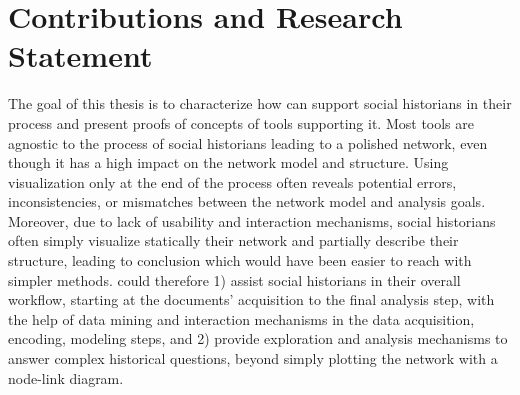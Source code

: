 




\section{Contributions and Research Statement}\label{sec:contribution-and-research-statement}

The goal of this thesis is to characterize how \va can support social historians in their \hsna process and present proofs of concepts of tools supporting it.
Most \snv tools are agnostic to the process of social historians leading to a polished network, even though it has a high impact on the network model and structure.
Using visualization only at the end of the process often reveals potential errors, inconsistencies, or mismatches between the network model and analysis goals\cite{alkadi2022}.
Moreover, due to lack of usability and interaction mechanisms, social historians often simply visualize statically their network and partially describe their structure, leading to conclusion which would have been easier to reach with simpler methods\cite{eveDeuxTraditionsAnalyse2002}.
\va could therefore 1) assist social historians in their overall workflow, starting at the documents' acquisition to the final analysis step, with the help of data mining and interaction mechanisms in the data acquisition, encoding, modeling steps, and 2) provide exploration and analysis mechanisms to answer complex historical questions, beyond simply plotting the network with a node-link diagram.

